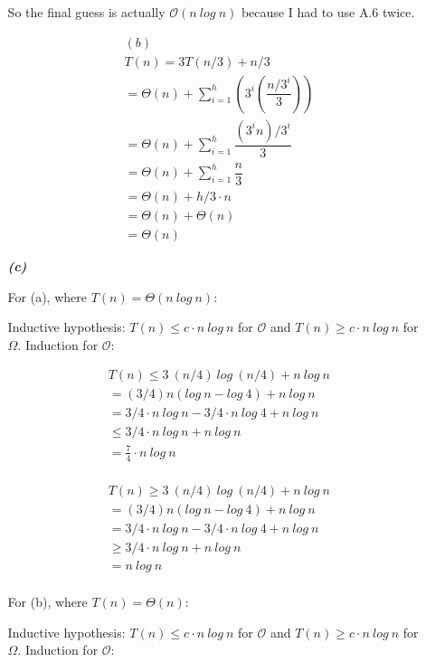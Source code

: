 \documentclass{article}
\begin{document}
\begin{enumerate}
\begin{enumerate}
		So the final guess is actually $\mathcal{O}(n\ log\ n)$ because I had to
		use A.6 twice.

		\begin{align*}
		& (b) \\
		& T(n) = 3T(n/3) + n/3 \\
		& = \Theta(n) + \sum_{i=1}^h (3^i (\dfrac{n/3^i}{3})) \\
		& = \Theta(n) + \sum_{i=1}^h \dfrac{(3^i n)/3^i}{3} \\
		& = \Theta(n) + \sum_{i=1}^h \dfrac{n}{3} \\
		& = \Theta(n) + h/3 \cdot n \\
		& = \Theta(n) + \Theta(n) \\
		& = \Theta(n)
		\end{align*}

		\item[\textbf{\emph{{(c)}}}]

		For (a), where $T(n) = \Theta(n\ log\ n)$:

		Inductive hypothesis: $T(n) \leq c \cdot n\ log\ n$ for $\mathcal{O}$ and $T(n) \geq c \cdot n\ log\ n$ for $\Omega$.
		Induction for $\mathcal{O}$:

		\begin{align*}
		& T(n) \leq 3\ (n/4)\ log\ (n/4) + n\ log\ n \\
		&  = (3/4)n(log\ n - log\ 4) + n\ log\ n \\
		&  = 3/4\cdot n\ log\ n - 3/4\cdot n\ log\ 4 + n\ log\ n \\
		&  \leq 3/4 \cdot n\ log\ n + n\ log\ n \\
		&  = \frac{7}{4} \cdot n\ log\ n \\
		\end{align*}

		\begin{align*}
		& T(n) \geq 3\ (n/4)\ log\ (n/4) + n\ log\ n \\
		&  = (3/4)n(log\ n - log\ 4) + n\ log\ n \\
		&  = 3/4\cdot n\ log\ n - 3/4\cdot n\ log\ 4 + n\ log\ n \\
		&  \geq 3/4 \cdot n\ log\ n + n\ log\ n \\
		&  = n\ log\ n \\
		\end{align*}

		For (b), where $T(n) = \Theta(n)$:

		Inductive hypothesis: $T(n) \leq c \cdot n\ log\ n$ for $\mathcal{O}$ and $T(n) \geq c \cdot n\ log\ n$ for $\Omega$.
		Induction for $\mathcal{O}$:


\end{enumerate}
\end{enumerate}
\end{document}
